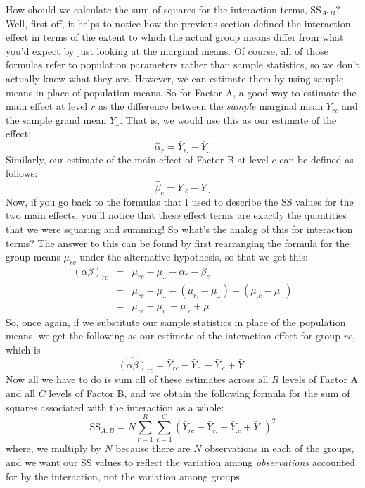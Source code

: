 
How should we calculate the sum of squares for the interaction terms, SS$_{A:B}$? Well, first off, it helps to notice how the previous section defined the interaction effect in terms of the extent to which the actual group means differ from what you'd expect by just looking at the marginal means. Of course, all of those formulas refer to population parameters rather than sample statistics, so we don't actually know what they are. However, we can estimate them by using sample means in place of population means. So for Factor A, a good way to estimate the main effect at level $r$ as the difference between the {\it sample} marginal mean $\bar{Y}_{rc}$ and the sample grand mean $\bar{Y}_{..}$. That is, we would use this as our estimate of the effect:
$$
\hat{\alpha}_r = \bar{Y}_{r.} - \bar{Y}_{..}
$$
Similarly, our estimate of the main effect of Factor B at level $c$ can be defined as follows:
$$
\hat{\beta}_c = \bar{Y}_{.c} - \bar{Y}_{..}
$$
Now, if you go back to the formulas that I used to describe the SS values for the two main effects, you'll notice that these effect terms are exactly the quantities that we were squaring and summing! So what's the analog of this for interaction terms? The answer to this can be found by first rearranging the formula for the group means $\mu_{rc}$ under the alternative hypothesis, so that we get this:
\begin{eqnarray*} 
(\alpha \beta)_{rc} &=& \mu_{rc} - \mu_{..} - \alpha_r - \beta_c \\
&=& \mu_{rc} - \mu_{..} - (\mu_{r.} - \mu_{..}) - (\mu_{.c} - \mu_{..}) \\
&=& \mu_{rc} - \mu_{r.} - \mu_{.c} + \mu_{..}
\end{eqnarray*}
So, once again, if we substitute our sample statistics in place of the population means, we get the following as our estimate of the interaction effect for group $rc$, which is
$$
\hat{(\alpha\beta)}_{rc} = \bar{Y}_{rc} - \bar{Y}_{r.} - \bar{Y}_{.c} + \bar{Y}_{..}
$$
Now all we have to do is sum all of these estimates across all $R$ levels of Factor A and all $C$ levels of Factor B, and we obtain the following formula for the sum of squares associated with the interaction as a whole:
$$
\mbox{SS}_{A:B} = N \sum_{r=1}^R \sum_{c=1}^C \left( \bar{Y}_{rc} - \bar{Y}_{r.} - \bar{Y}_{.c} + \bar{Y}_{..} \right)^2
$$
where, we multiply by $N$ because there are $N$ observations in each of the groups, and we want our SS values to reflect the variation among {\it observations} accounted for by the interaction, not the variation among groups. 



